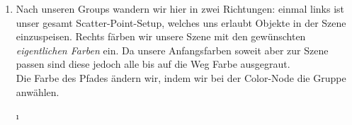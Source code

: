 \documentclass[paper=a4,fontsize=12pt,ngerman]{scrartcl}
\begin{document}
\begin{enumerate}
\begin{minipage}{0.14\textwidth}
		\end{minipage}
		\item 
		\begin{minipage}{0.86\textwidth}
			Nach unseren Groups wandern wir hier in zwei Richtungen: einmal links ist unser gesamt Scatter-Point-Setup, welches uns erlaubt Objekte in der Szene einzuspeisen. Rechts färben wir unsere Szene mit den gewünschten \textit{eigentlichen Farben} ein. Da unsere Anfangsfarben soweit aber zur Szene passen sind diese jedoch alle bis auf die Weg Farbe ausgegraut.\\
			Die Farbe des Pfades ändern wir, indem wir bei der Color-Node die Gruppe anwählen.
		\end{minipage}
		\begin{minipage}{0.14\textwidth}
			\i
\end{minipage}
\end{enumerate}
\end{document}
